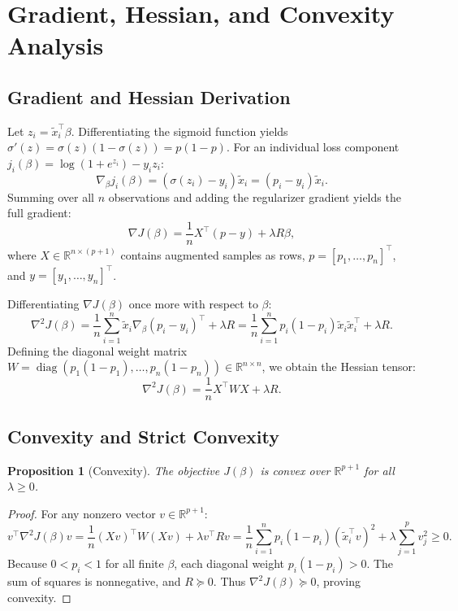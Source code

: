 \documentclass[11pt,a4paper]{article}
\newtheorem{proposition}{Proposition}
\theoremstyle{remark}\newtheorem{remark}{Remark}
\begin{document}
\section{Gradient, Hessian, and Convexity Analysis}

\subsection{Gradient and Hessian Derivation}
Let $z_i = \tilde{x}_i^\top \beta$. Differentiating the sigmoid function yields $\sigma'(z) = \sigma(z)(1 - \sigma(z)) = p(1 - p)$. For an individual loss component $j_i(\beta) = \log(1 + e^{z_i}) - y_i z_i$:
\begin{equation}
  \nabla_\beta j_i(\beta) = (\sigma(z_i) - y_i) \tilde{x}_i = (p_i - y_i) \tilde{x}_i.
\end{equation}
Summing over all $n$ observations and adding the regularizer gradient yields the full gradient:
\begin{equation}\label{eq:grad}
  \boxed{\nabla J(\beta) = \frac{1}{n} X^\top (p - y) + \lambda R \beta},
\end{equation}
where $X \in \mathbb{R}^{n \times (p+1)}$ contains augmented samples as rows, $p = [p_1, \dots, p_n]^\top$, and $y = [y_1, \dots, y_n]^\top$.

Differentiating $\nabla J(\beta)$ once more with respect to $\beta$:
\begin{equation}
  \nabla^2 J(\beta) = \frac{1}{n} \sum_{i=1}^n \tilde{x}_i \nabla_\beta (p_i - y_i)^\top + \lambda R = \frac{1}{n} \sum_{i=1}^n p_i (1 - p_i) \tilde{x}_i \tilde{x}_i^\top + \lambda R.
\end{equation}
Defining the diagonal weight matrix $W = \operatorname{diag}(p_1(1-p_1), \dots, p_n(1-p_n)) \in \mathbb{R}^{n \times n}$, we obtain the Hessian tensor:
\begin{equation}\label{eq:hess}
  \boxed{\nabla^2 J(\beta) = \frac{1}{n} X^\top W X + \lambda R}.
\end{equation}

\subsection{Convexity and Strict Convexity}
\begin{proposition}[Convexity]
The objective $J(\beta)$ is convex over $\mathbb{R}^{p+1}$ for all $\lambda \ge 0$.
\end{proposition}
\begin{proof}
For any nonzero vector $v \in \mathbb{R}^{p+1}$:
\begin{equation}
  v^\top \nabla^2 J(\beta) v = \frac{1}{n} (X v)^\top W (X v) + \lambda v^\top R v = \frac{1}{n} \sum_{i=1}^n p_i(1 - p_i) (\tilde{x}_i^\top v)^2 + \lambda \sum_{j=1}^p v_j^2 \ge 0.
\end{equation}
Because $0 < p_i < 1$ for all finite $\beta$, each diagonal weight $p_i(1-p_i) > 0$. The sum of squares is nonnegative, and $R \succeq 0$. Thus $\nabla^2 J(\beta) \succeq 0$, proving convexity.
\end{proof}
\end{document}
